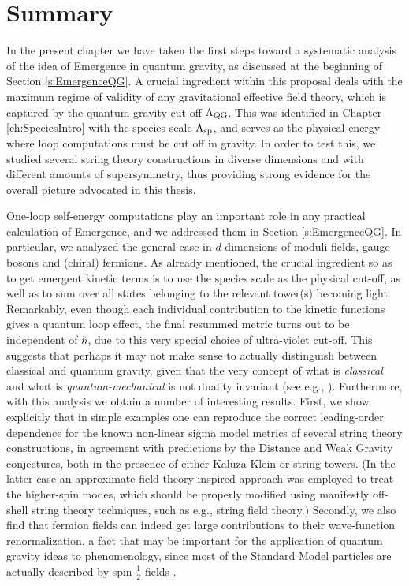 \section{Summary}

In the present chapter we have taken the first steps toward a systematic analysis of the idea of Emergence in quantum gravity, as discussed at the beginning of Section \ref{s:EmergenceQG}. A crucial ingredient within this proposal deals with the maximum regime of validity of any gravitational effective field theory, which is captured by the quantum gravity cut-off $\Lambda_{\text{QG}}$. This was identified in Chapter \ref{ch:SpeciesIntro} with the species scale $\Lambda_{\text{sp}}$, and serves as the physical energy where loop computations must be cut off in gravity. In order to test this, we studied several string theory constructions in diverse dimensions and with different amounts of supersymmetry, thus providing strong evidence for the overall picture advocated in this thesis. 
 
One-loop self-energy computations play an important role in any practical calculation of Emergence, and we addressed them in Section \ref{s:EmergenceQG}. In particular, we analyzed the general case in $d$-dimensions of moduli fields, gauge bosons and (chiral) fermions. As already mentioned, the crucial ingredient so as to get emergent kinetic terms is to use the species scale as the physical cut-off, as well as to sum over all states belonging to the relevant tower(s) becoming light. Remarkably, even though each individual contribution to the kinetic functions gives a quantum loop effect, the final resummed metric turns out to be independent of $\hbar$, due to this very special choice of ultra-violet cut-off. This suggests that perhaps it may not make sense to actually distinguish between classical and quantum gravity, given that the very concept of what is \emph{classical} and what is \emph{quantum-mechanical} is not duality invariant (see e.g., \cite{Vafa:1995fj,Strominger:1995qi}). Furthermore, with this analysis we obtain a number of interesting results. First, we show explicitly that in simple examples one can reproduce the correct leading-order dependence for the known non-linear sigma model metrics of several string theory constructions, in agreement with predictions by the Distance and Weak Gravity conjectures, both in the presence of either Kaluza-Klein or string towers. (In the latter case an approximate field theory inspired approach was employed to treat the higher-spin modes, which should be properly modified using manifestly off-shell string theory techniques, such as e.g., string field theory.) Secondly, we also find that fermion fields can indeed get large contributions to their wave-function renormalization, a fact that may be important for the application of quantum gravity ideas to phenomenology, since most of the Standard Model particles are actually described by spin-$\frac{1}{2}$ fields \cite{Castellano:2023qhp}.  
 
